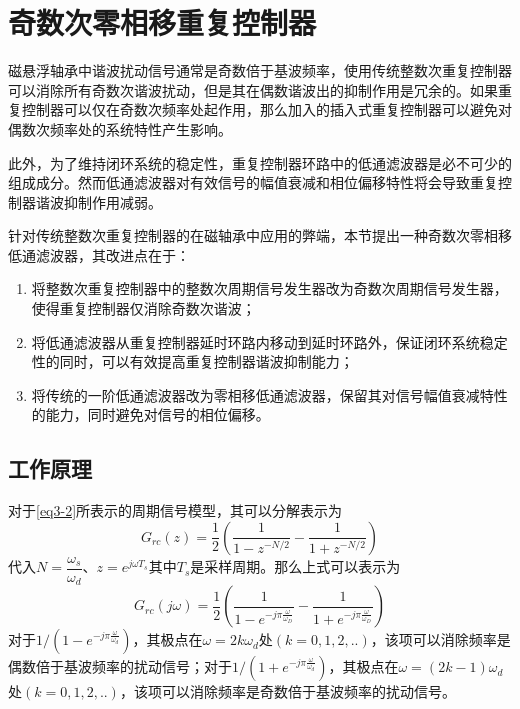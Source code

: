 \documentclass[
  lang=cn,
  degree=master,
  openany,oneside
]{nuaathesis}
\begin{document}
\section{奇数次零相移重复控制器}
磁悬浮轴承中谐波扰动信号通常是奇数倍于基波频率，使用传统整数次重复控制器可以消除所有奇数次谐波扰动，但是其在偶数谐波出的抑制作用是冗余的。如果重复控制器可以仅在奇数次频率处起作用，那么加入的插入式重复控制器可以避免对偶数次频率处的系统特性产生影响。

此外，为了维持闭环系统的稳定性，重复控制器环路中的低通滤波器是必不可少的组成成分。然而低通滤波器对有效信号的幅值衰减和相位偏移特性将会导致重复控制器谐波抑制作用减弱。

针对传统整数次重复控制器的在磁轴承中应用的弊端，本节提出一种奇数次零相移低通滤波器，其改进点在于：
\begin{enumerate}
	\item 将整数次重复控制器中的整数次周期信号发生器改为奇数次周期信号发生器，使得重复控制器仅消除奇数次谐波；
	\item 将低通滤波器从重复控制器延时环路内移动到延时环路外，保证闭环系统稳定性的同时，可以有效提高重复控制器谐波抑制能力；
	\item 将传统的一阶低通滤波器改为零相移低通滤波器，保留其对信号幅值衰减特性的能力，同时避免对信号的相位偏移。
\end{enumerate}
\subsection{工作原理}
对于\autoref{eq3-2}所表示的周期信号模型，其可以分解表示为
\begin{equation}
G_{rc}(z)=\dfrac{1}{2}\left(\dfrac{1}{1-z^{-N/2}}-\dfrac{1}{1+z^{-N/2}}\right)
\end{equation}
代入$N=\dfrac{\omega_s}{\omega_d}$、$z=e^{j\omega T_s}$其中$T_s$是采样周期。那么上式可以表示为
\begin{equation}
G_{rc}(j\omega)=\frac{1}{2}\left(\frac{1}{1-e^{-j\pi\frac{\omega}{\omega_D}}}-\frac{1}{1+e^{-j\pi\frac{\omega}{\omega_D}}}\right)
\end{equation}
对于${1}/\left(1-e^{-j\pi\frac{\omega}{\omega_d}}\right)$，其极点在$\omega=2k\omega_d$处$(k=0,1,2,..)$，该项可以消除频率是偶数倍于基波频率的扰动信号；对于${1}/\left(1+e^{-j\pi\frac{\omega}{\omega_d}}\right)$，其极点在$\omega=(2k-1)\omega_d$处$(k=0,1,2,..)$，该项可以消除频率是奇数倍于基波频率的扰动信号。
\end{document}
